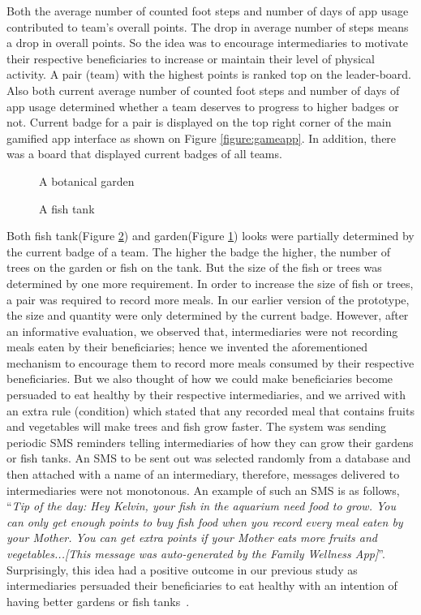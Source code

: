 \documentclass{sig-alternate}
\begin{document}
Both the average number of counted foot steps and number of days of app usage contributed to team's overall points. The drop in average number of steps means a drop in overall points. So the idea was to encourage intermediaries to motivate their respective beneficiaries to increase or maintain their level of physical activity. A pair (team) with the highest points is ranked top on the leader-board. Also both current average number of counted foot steps  and number of days of app usage determined whether a team deserves to progress to higher badges or not. Current badge for a pair is displayed on the top right corner of the main gamified app interface as shown on Figure \ref{figure:gameapp}. In addition, there was a board that displayed current badges of all teams.

\begin{figure}[H]
\centering
{}
\caption{A botanical garden}
\label{figure:botanical}
\end{figure}

\begin{figure}[H]
\centering
{}
\caption{A fish tank}
\label{figure:tank}
\end{figure}

Both fish tank(Figure \ref{figure:tank}) and garden(Figure \ref{figure:botanical}) looks were partially determined by the current badge of a team. The higher the badge the higher, the number of trees on the garden or fish on the tank. But the size of the fish or trees was determined by one more requirement. In order to increase the size of fish or trees, a pair was required to record more meals. In our earlier version of the prototype, the size and quantity were only determined by the current badge. However, after an informative evaluation, we observed that, intermediaries were not recording meals eaten by their beneficiaries; hence we invented the aforementioned mechanism to encourage them to record more meals consumed by their respective beneficiaries. But we also thought of how we could make beneficiaries become persuaded to eat healthy by their respective intermediaries, and we arrived with an extra rule (condition) which stated that any recorded meal that contains fruits and vegetables will make trees and fish grow faster. The system was sending periodic SMS reminders telling intermediaries of how they can grow their gardens or fish tanks. An SMS to be sent out was selected randomly from a database and then attached with a name of an intermediary, therefore, messages delivered to intermediaries were not monotonous. An example of such an SMS is as follows, ``\emph{Tip of the day: Hey Kelvin, your fish in the aquarium need food to grow. You can only get enough points to buy fish food when you record every meal eaten by your Mother. You can get extra points if your Mother eats more fruits and vegetables...[This message was auto-generated by the Family Wellness App]}''. Surprisingly, this idea had a positive outcome in our previous study as intermediaries persuaded their beneficiaries to eat healthy with an intention of having better gardens or fish tanks~\cite{katule2016:leveraging}.
\end{document}
